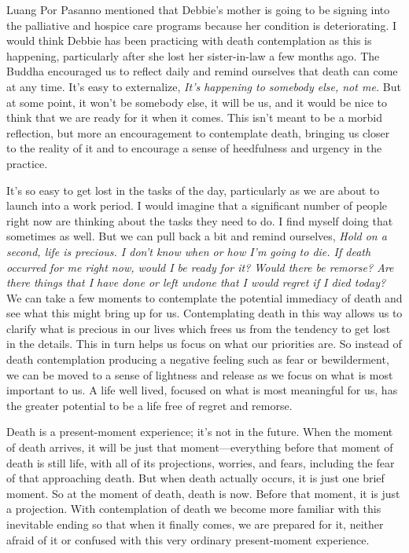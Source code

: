 
Luang Por Pasanno mentioned that Debbie's mother is going to be signing 
into the palliative and hospice care programs because her condition is 
deteriorating. I would think Debbie has been practicing with death 
contemplation as this is happening, particularly after she lost her 
sister-in-law a few months ago. The Buddha encouraged us to reflect 
daily and remind ourselves that death can come at any time. It's easy 
to externalize, \emph{It's happening to somebody else, not me.} But at 
some point, it won't be somebody else, it will be us, and it would be 
nice to think that we are ready for it when it comes. This isn't meant 
to be a morbid reflection, but more an encouragement to contemplate 
death, bringing us closer to the reality of it and to encourage a sense 
of heedfulness and urgency in the practice.

It's so easy to get lost in the tasks of the day, particularly as we 
are about to launch into a work period. I would imagine that a 
significant number of people right now are thinking about the tasks 
they need to do. I find myself doing that sometimes as well. But we can 
pull back a bit and remind ourselves, \emph{Hold on a second, life is 
precious. I don't know when or how I'm going to die. If death occurred 
for me right now, would I be ready for it? Would there be remorse? Are 
there things that I have done or left undone that I would regret if I 
died today?} We can take a few moments to contemplate the potential 
immediacy of death and see what this might bring up for us. 
Contemplating death in this way allows us to clarify what is precious 
in our lives which frees us from the tendency to get lost in the 
details. This in turn helps us focus on what our priorities are. So 
instead of death contemplation producing a negative feeling such as 
fear or bewilderment, we can be moved to a sense of lightness and 
release as we focus on what is most important to us. A life well lived, 
focused on what is most meaningful for us, has the greater potential to 
be a life free of regret and remorse.

Death is a present-moment experience; it's not in the future. When the 
moment of death arrives, it will be just that moment---everything 
before that moment of death is still life, with all of its projections, 
worries, and fears, including the fear of that approaching death. But 
when death actually occurs, it is just one brief moment. So at the 
moment of death, death is now. Before that moment, it is just a 
projection. With contemplation of death we become more familiar with 
this inevitable ending so that when it finally comes, we are prepared 
for it, neither afraid of it or confused with this very ordinary 
present-moment experience.

